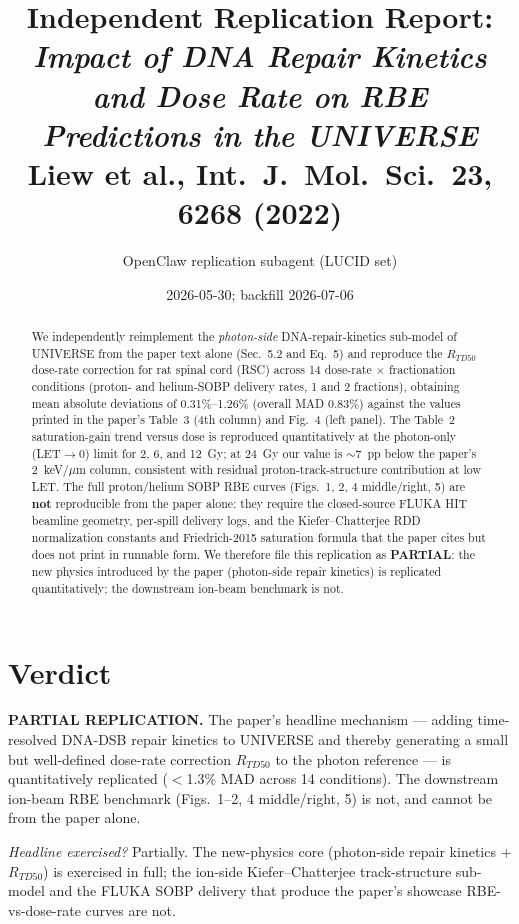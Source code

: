 \documentclass[11pt]{article}
\title{Independent Replication Report:\\
\textit{Impact of DNA Repair Kinetics and Dose Rate on RBE Predictions in the UNIVERSE}\\
Liew et al., Int.\ J.\ Mol.\ Sci.\ \textbf{23}, 6268 (2022)}
\author{OpenClaw replication subagent (LUCID set)}
\date{2026-05-30; backfill 2026-07-06}
\begin{document}
\maketitle

\begin{abstract}
We independently reimplement the \emph{photon-side} DNA-repair-kinetics sub-model
of UNIVERSE from the paper text alone (Sec.~5.2 and Eq.~5) and reproduce the
$R_{TD50}$ dose-rate correction for rat spinal cord (RSC) across
14 dose-rate $\times$ fractionation conditions (proton- and helium-SOBP delivery
rates, 1 and 2 fractions), obtaining mean absolute deviations of
0.31\%--1.26\% (overall MAD 0.83\%) against the values printed in the paper's
Table~3 (4th column) and Fig.~4 (left panel). The Table~2 saturation-gain
trend versus dose is reproduced quantitatively at the photon-only
(LET$\to$0) limit for 2, 6, and 12~Gy; at 24~Gy our value is $\sim$7~pp below
the paper's 2~keV/$\mu$m column, consistent with residual proton-track-structure
contribution at low LET. The full proton/helium SOBP RBE curves
(Figs.~1, 2, 4 middle/right, 5) are \textbf{not} reproducible from the paper
alone: they require the closed-source FLUKA HIT beamline geometry, per-spill
delivery logs, and the Kiefer--Chatterjee RDD normalization constants and
Friedrich-2015 saturation formula that the paper cites but does not print in
runnable form. We therefore file this replication as \textbf{PARTIAL}: the new
physics introduced by the paper (photon-side repair kinetics) is replicated
quantitatively; the downstream ion-beam benchmark is not.
\end{abstract}

\section{Verdict}

\textbf{PARTIAL REPLICATION.} The paper's headline mechanism ---
adding time-resolved DNA-DSB repair kinetics to UNIVERSE and thereby
generating a small but well-defined dose-rate correction $R_{TD50}$ to the
photon reference --- is quantitatively replicated ($<$1.3\% MAD across
14 conditions). The downstream ion-beam RBE benchmark (Figs.~1--2, 4
middle/right, 5) is not, and cannot be from the paper alone.

\emph{Headline exercised?} Partially. The new-physics core (photon-side
repair kinetics + $R_{TD50}$) is exercised in full; the ion-side
Kiefer--Chatterjee track-structure sub-model and the FLUKA SOBP delivery
that produce the paper's showcase RBE-vs-dose-rate curves are not.
\end{document}
